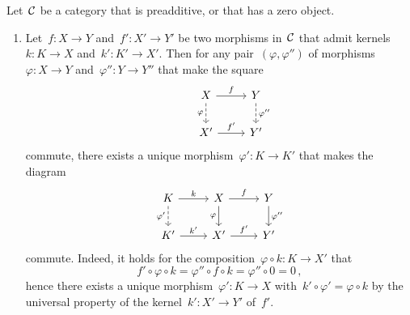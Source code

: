 \begin{remark*}
  \label{functoriality of (co)kernel}
  Let~$\mathcal{C}$ be a category that is preadditive, or that has a zero object.
  \begin{enumerate}
    \item
      Let~$f \colon X \to Y$ and~$f' \colon X' \to Y'$ be two morphisms in~$\mathcal{C}$ that admit kernels~$k \colon K \to X$ and~$k' \colon K' \to X'$.
      Then for any pair~$(\varphi,\varphi'')$ of morphisms~$\varphi \colon X \to Y$ and~$\varphi'' \colon Y \to Y''$ that make the square
      \[
        \begin{tikzcd}
          & X
            \arrow{r}[above]{f}
            \arrow[dashed]{d}[left]{\varphi}
          & Y
            \arrow[dashed]{d}[right]{\varphi''}
          \\
          & X'
            \arrow{r}[above]{f'}
          & Y'
        \end{tikzcd}
      \]
      commute, there exists a unique morphism~$\varphi' \colon K \to K'$ that makes the diagram
      \[
        \begin{tikzcd}
            K
            \arrow{r}[above]{k}
            \arrow[dashed]{d}[left]{\varphi'}
          & X
            \arrow{r}[above]{f}
            \arrow{d}[left]{\varphi}
          & Y
            \arrow{d}[right]{\varphi''}
          \\
            K'
            \arrow{r}[above]{k'}
          & X'
            \arrow{r}[above]{f'}
          & Y'
        \end{tikzcd}
      \]
      commute.
      Indeed, it holds for the composition~$\varphi \circ k \colon K \to X'$ that
      \[
          f' \circ \varphi \circ k
        = \varphi'' \circ f \circ k
        = \varphi'' \circ 0
        = 0 \,,
      \]
      hence there exists a unique morphism~$\varphi' \colon K \to X$ with~$k' \circ \varphi' = \varphi \circ k$ by the universal property of the kernel~$k' \colon X' \to Y'$ of~$f'$.
      

\end{enumerate}
\end{remark*}
